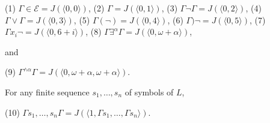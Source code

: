 (1) $\Gamma \in \mathcal{E} = J(\langle 0, 0 \rangle)$,
(2) $\Gamma = J(\langle 0, 1 \rangle)$,
(3) $\Gamma \neg \Gamma = J(\langle 0, 2 \rangle)$,
(4) $\Gamma \vee \Gamma = J(\langle 0, 3 \rangle)$,
(5) $\Gamma (\neg) = J(\langle 0, 4 \rangle)$,
(6) $\Gamma) \neg = J(\langle 0, 5 \rangle)$,
(7) $\Gamma x_i \neg = J(\langle 0, 6 + i \rangle)$,
(8) $\Gamma \exists^\alpha \Gamma = J(\langle 0, \omega + \alpha \rangle)$,

and

(9) $\Gamma^{\wedge \alpha} \Gamma = J(\langle 0, \omega + \alpha, \omega + \alpha \rangle)$.

For any finite sequence $s_1, \ldots, s_n$ of symbols of $L$,

(10) $\Gamma s_1, \ldots, s_n \Gamma = J(\langle 1, \Gamma s_1, \ldots, \Gamma s_n \rangle)$.
